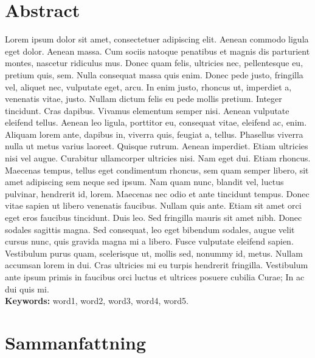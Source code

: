 \documentclass[a4paper,11pt]{article}
\begin{document}
\newpage


\section*{Abstract}

  Lorem ipsum dolor sit amet, consectetuer adipiscing elit. Aenean commodo
  ligula eget dolor. Aenean massa. Cum sociis natoque penatibus et magnis dis
  parturient montes, nascetur ridiculus mus. Donec quam felis, ultricies nec,
  pellentesque eu, pretium quis, sem. Nulla consequat massa quis enim. Donec
  pede justo, fringilla vel, aliquet nec, vulputate eget, arcu. In enim justo,
  rhoncus ut, imperdiet a, venenatis vitae, justo. Nullam dictum felis eu pede
  mollis pretium. Integer tincidunt. Cras dapibus. Vivamus elementum semper
  nisi. Aenean vulputate eleifend tellus. Aenean leo ligula, porttitor eu,
  consequat vitae, eleifend ac, enim. Aliquam lorem ante, dapibus in, viverra
  quis, feugiat a, tellus. Phasellus viverra nulla ut metus varius laoreet.
  Quisque rutrum. Aenean imperdiet. Etiam ultricies nisi vel augue. Curabitur
  ullamcorper ultricies nisi. Nam eget dui. Etiam rhoncus. Maecenas tempus,
  tellus eget condimentum rhoncus, sem quam semper libero, sit amet adipiscing
  sem neque sed ipsum. Nam quam nunc, blandit vel, luctus pulvinar, hendrerit
  id, lorem. Maecenas nec odio et ante tincidunt tempus. Donec vitae sapien ut
  libero venenatis faucibus. Nullam quis ante. Etiam sit amet orci eget eros
  faucibus tincidunt. Duis leo. Sed fringilla mauris sit amet nibh. Donec
  sodales sagittis magna. Sed consequat, leo eget bibendum sodales, augue velit
  cursus nunc, quis gravida magna mi a libero. Fusce vulputate eleifend sapien.
  Vestibulum purus quam, scelerisque ut, mollis sed, nonummy id, metus. Nullam
  accumsan lorem in dui. Cras ultricies mi eu turpis hendrerit fringilla.
  Vestibulum ante ipsum primis in faucibus orci luctus et ultrices posuere
  cubilia Curae; In ac dui quis mi. \\

  \textbf{Keywords:} word1, word2, word3, word4, word5.


\newpage

\section*{Sammanfattning}
\end{document}

